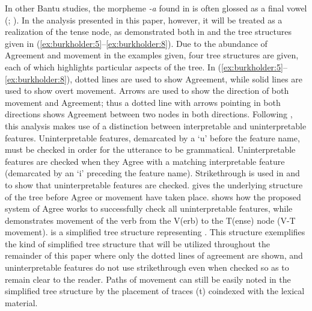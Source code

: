 \documentclass[output=paper]{langsci/langscibook}
\begin{document}
 
In other Bantu studies, the morpheme \textit{-a} found in  is often glossed as a final vowel (\citealt{Khumalo1981,Khumalo1982}; \citealt{Sibanda2004}). In the analysis presented in this paper, however, it will be treated as a realization of the tense node, as demonstrated both in  and the tree structures given in (\ref{ex:burkholder:5}--\ref{ex:burkholder:8}). Due to the abundance of Agreement and movement in the examples given, four tree structures are given, each of which highlights particular aspects of the tree. In (\ref{ex:burkholder:5}--\ref{ex:burkholder:8}), dotted lines are used to show Agreement, while solid lines are used to show overt movement. Arrows are used to show the direction of both movement and Agreement; thus a dotted line with arrows pointing in both directions shows Agreement between two nodes in both directions. Following \citet{Chomsky2001}, this analysis makes use of a distinction between interpretable and uninterpretable features. Uninterpretable features, demarcated by a `u' before the feature name, must be checked in order for the utterance to be grammatical. Uninterpretable features are checked when they Agree with a matching interpretable feature (demarcated by an `i' preceding the feature name). Strikethrough is used in  and  to show that uninterpretable features are checked.   gives the underlying structure of the tree before Agree or movement have taken place.  shows how the proposed system of Agree works to successfully check all uninterpretable features, while  demonstrates movement of the verb from the V(erb) to the T(ense) node (V-T movement).  is a simplified tree structure representing . This structure exemplifies the kind of simplified tree structure that will be utilized throughout the remainder of this paper where only the dotted lines of agreement are shown, and uninterpretable features do not use strikethrough even when checked so as to remain clear to the reader. Paths of movement can still be easily noted in the simplified tree structure by the placement of traces (t) coindexed with the lexical material.

 
\end{document}
